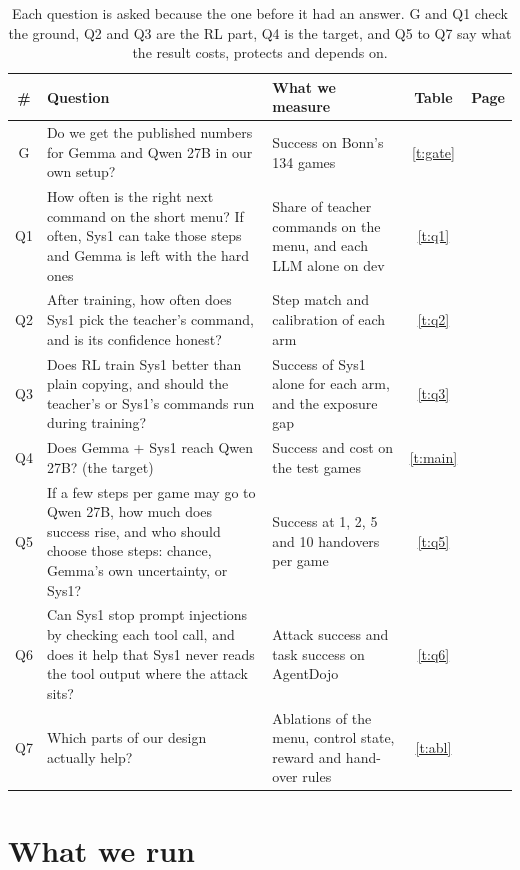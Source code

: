\documentclass[10pt]{article}
\begin{document}
\begin{table}[H]
\footnotesize
\caption{Each question is asked because the one before it had an answer. G and Q1 check the ground, Q2 and Q3 are the RL part, Q4 is the target, and Q5 to Q7 say what the result costs, protects and depends on.}
\label{t:story}
\begin{tabularx}{\linewidth}{@{}c L P{7.6cm} c c@{}}
\toprule
\# & Question & What we measure & Table & Page \\
\midrule
G & Do we get the published numbers for Gemma and Qwen 27B in our own setup? & Success on Bonn's 134 games & \ref{t:gate} & \pageref{t:gate} \\
Q1 & How often is the right next command on the short menu? If often, Sys1 can take those steps and Gemma is left with the hard ones & Share of teacher commands on the menu, and each LLM alone on dev & \ref{t:q1} & \pageref{t:q1} \\
Q2 & After training, how often does Sys1 pick the teacher's command, and is its confidence honest? & Step match and calibration of each arm & \ref{t:q2} & \pageref{t:q2} \\
Q3 & Does RL train Sys1 better than plain copying, and should the teacher's or Sys1's commands run during training? & Success of Sys1 alone for each arm, and the exposure gap & \ref{t:q3} & \pageref{t:q3} \\
Q4 & Does Gemma + Sys1 reach Qwen 27B? (the target) & Success and cost on the test games & \ref{t:main} & \pageref{t:main} \\
Q5 & If a few steps per game may go to Qwen 27B, how much does success rise, and who should choose those steps: chance, Gemma's own uncertainty, or Sys1? & Success at 1, 2, 5 and 10 handovers per game & \ref{t:q5} & \pageref{t:q5} \\
Q6 & Can Sys1 stop prompt injections by checking each tool call, and does it help that Sys1 never reads the tool output where the attack sits? & Attack success and task success on AgentDojo & \ref{t:q6} & \pageref{t:q6} \\
Q7 & Which parts of our design actually help? & Ablations of the menu, control state, reward and hand-over rules & \ref{t:abl} & \pageref{t:abl} \\
\bottomrule
\end{tabularx}
\end{table}

\section{What we run}
\end{document}
